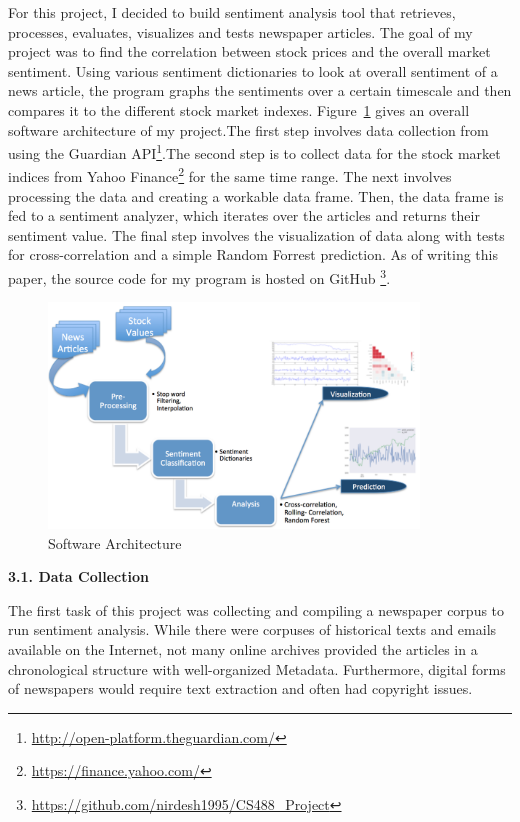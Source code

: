 \documentclass{acm_proc_article-sp}
\begin{document}
For this project, I decided to build sentiment analysis tool that retrieves, processes, evaluates, visualizes and tests newspaper articles. The goal of my project was to find the correlation between stock prices and the overall market sentiment. Using various sentiment dictionaries to look at overall sentiment of a news article, the program graphs the sentiments over a certain timescale and then compares it to the different stock market indexes. Figure~\ref{fig:software} gives an overall software architecture of my project.The first step involves data collection from using the Guardian API\footnote{\url{http://open-platform.theguardian.com/}}.The second step is to collect data for the stock market indices from Yahoo Finance\footnote{\url{https://finance.yahoo.com/}} for the same time range. The next involves processing the data and creating a workable data frame. Then, the data frame is fed to a sentiment analyzer, which iterates over the articles and returns their sentiment value. The final step involves the visualization of data along with tests for cross-correlation and a simple Random Forrest prediction. As of writing this paper, the source code for my program is hosted on GitHub \footnote{\url{https://github.com/nirdesh1995/CS488_Project} }.

\begin{figure}[htp]
\centering
\includegraphics[width=\linewidth,height=6cm]{figures/software_architecture.png}
\caption{Software Architecture}
\label{fig:software}
\end{figure}

\textbf{3.1. Data Collection }


The first task of this project was collecting and compiling a newspaper corpus to run sentiment analysis. While there were corpuses of historical texts and emails available on the Internet, not many online archives provided the articles in a chronological structure with well-organized Metadata. Furthermore, digital forms of newspapers would require text extraction and often had copyright issues. 
\end{document}
